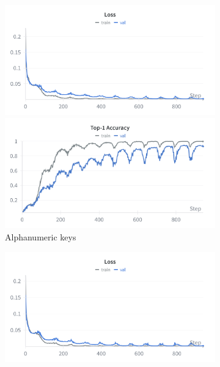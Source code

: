 \documentclass[a4paper,11pt,twoside]{report}
\theoremstyle{definition}
\begin{document}
\begin{figure}[h!]
\centering

\begin{subfigure}{\linewidth}
    \centering
    \begin{minipage}{0.45\linewidth}
        \centering
        \includegraphics[width=\linewidth]{img_results/loss_alphanum.png}
    \end{minipage}
    \hfill
    \begin{minipage}{0.45\linewidth}
        \centering
        \includegraphics[width=\linewidth]{img_results/acc_alphanum.png}
    \end{minipage}
    \caption{Alphanumeric keys}
\end{subfigure}
\vspace{0.5em}
\begin{subfigure}{\linewidth}
    \centering
    \begin{minipage}{0.45\linewidth}
        \centering
        \includegraphics[width=\linewidth]{img_results/loss_all.png}

\end{minipage}
\end{subfigure}
\end{figure}
\end{document}
